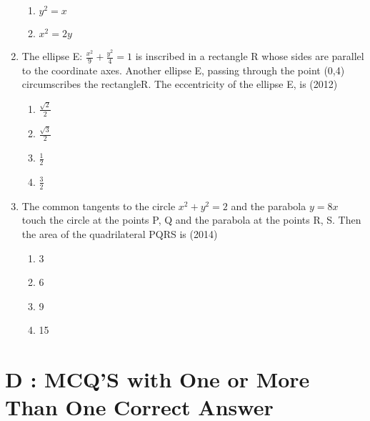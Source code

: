 \documentclass[12pt]{article}
\begin{document}
\begin{enumerate}
\begin{enumerate}
\item $y^2=x$
\item $x^2=2y$
\end{enumerate}
\item The ellipse E: $\frac{x^2}{9}+\frac{y^2}{4}=1$ is inscribed in a rectangle R whose sides are parallel to the coordinate axes. Another ellipse E, passing through the point (0,4) circumscribes the rectangleR. The eccentricity of the ellipse E, is (2012)
\begin{enumerate}
\item $\frac{\sqrt{2}}{2}$
\item $\frac{\sqrt{3}}{2}$
\item $\frac{1}{2}$
\item $\frac{3}{2}$ 
\end{enumerate}
\item The common tangents to the circle $x^2+y^2=2$ and the parabola $y=8x$ touch the circle at the points P, Q and the parabola at the points R, S. Then the area of the quadrilateral PQRS is (2014)
\begin{enumerate}
\item 3
\item 6
\item 9
\item 15
\end{enumerate}
\end{enumerate}


\section*{D  :  MCQ'S with One or More Than One Correct Answer}
\end{document}
